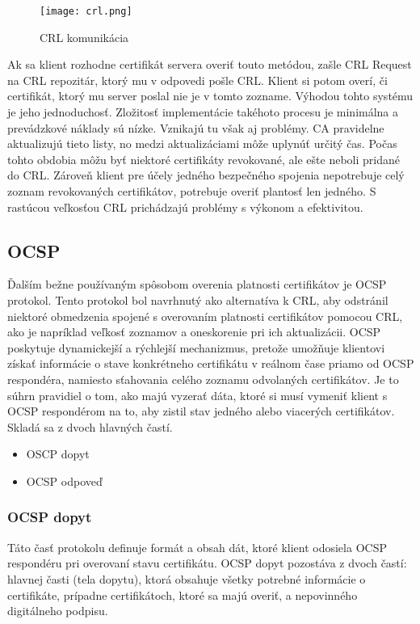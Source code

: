 \documentclass[12pt, twoside]{book}
\begin{document}
\begin{figure}[H]
\texttt{[image: crl.png]}
\caption{CRL komunikácia}
\end{figure}

Ak sa klient rozhodne certifikát servera overiť touto metódou, zašle CRL Request na CRL repozitár, ktorý mu v odpovedi pošle CRL. Klient si potom overí, či certifikát, ktorý mu server poslal nie je v tomto zozname. Výhodou tohto systému je jeho jednoduchosť. Zložitosť implementácie takéhoto procesu je minimálna a prevádzkové náklady sú nízke. Vznikajú tu však aj problémy. CA pravidelne aktualizujú tieto listy, no medzi aktualizáciami môže uplynúť určitý čas. Počas tohto obdobia môžu byť niektoré certifikáty revokované, ale ešte neboli pridané do CRL. Zároveň klient pre účely jedného bezpečného spojenia nepotrebuje celý zoznam revokovaných certifikátov, potrebuje overiť plantosť len jedného. S rastúcou veľkosťou CRL prichádzajú problémy s výkonom a efektivitou.\cite{rfc5280, certs2}


\subsection{OCSP}
Ďalším bežne používaným spôsobom overenia platnosti certifikátov je OCSP protokol. Tento protokol bol navrhnutý ako alternatíva k CRL, aby odstránil niektoré obmedzenia spojené s overovaním platnosti certifikátov pomocou CRL, ako je napríklad veľkosť zoznamov a oneskorenie pri ich aktualizácii. OCSP poskytuje dynamickejší a rýchlejší mechanizmus, pretože umožňuje klientovi získať informácie o stave konkrétneho certifikátu v reálnom čase priamo od OCSP respondéra, namiesto sťahovania celého zoznamu odvolaných certifikátov.\cite{certs2}
Je to súhrn pravidiel o tom, ako majú vyzerať dáta, ktoré si musí vymeniť klient s OCSP respondérom na to, aby zistil stav jedného alebo viacerých certifikátov. Skladá sa z dvoch hlavných častí.\cite{certs2, rfc6960}

\begin{itemize}
\item OSCP dopyt
\item OCSP odpoveď
\end{itemize}

\subsubsection{OCSP dopyt}
Táto časť protokolu definuje formát a obsah dát, ktoré klient odosiela OCSP respondéru pri overovaní stavu certifikátu. OCSP dopyt pozostáva z dvoch častí: hlavnej časti (tela dopytu), ktorá obsahuje všetky potrebné informácie o certifikáte, prípadne certifikátoch, ktoré sa majú overiť, a nepovinného digitálneho podpisu. \cite{rfc6960}
\end{document}
